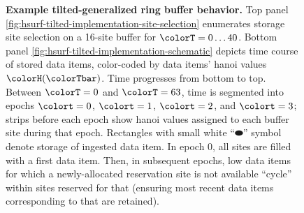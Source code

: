 \begin{figure}[htbp!]
\vspace{-2ex}\caption{%
  \textbf{Example tilted-generalized ring buffer behavior.}
  \footnotesize
  Top panel \ref{fig:hsurf-tilted-implementation-site-selection} enumerates storage site selection on a 16-site buffer for $\colorT=0 \ldots 40$.
  Bottom panel \ref{fig:hsurf-tilted-implementation-schematic} depicts time course of stored data items, color-coded by data items' hanoi values $\colorH(\colorTbar)$.
  Time progresses from bottom to top.
  Between $\colorT=0$ and $\colorT=63$, time is segmented into epochs $\colort=0$, $\colort=1$, $\colort=2$, and $\colort=3$; strips before each epoch show hanoi values assigned to each buffer site during that epoch.
  Rectangles with small white ``$\blkhorzoval$'' symbol denote storage of ingested data item.
  In epoch 0, all sites are filled with a first data item.
  Then, in subsequent epochs, low \hv{} data items for which a newly-allocated reservation site is not available ``cycle'' within sites reserved for that \hv{} (ensuring most recent data items corresponding to that \hv{} are retained).
}
\label{fig:hsurf-tilted-implementation}

\end{figure}
